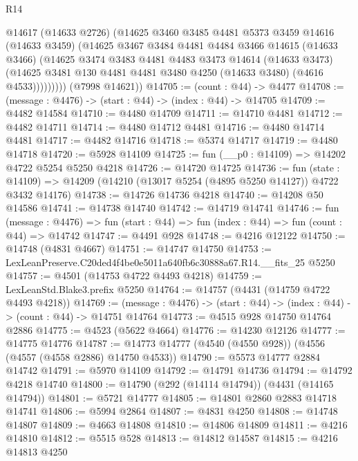 \begin{lexlean}{R14}
\begin{coremodule}
              @14617
              (@14633 @2726)
              (@14625
                @3460
                @3485
                @4481
                @5373
                @3459
                @14616
                (@14633 @3459)
                (@14625
                  @3467
                  @3484
                  @4481
                  @4484
                  @3466
                  @14615
                  (@14633 @3466)
                  (@14625
                    @3474
                    @3483
                    @4481
                    @4483
                    @3473
                    @14614
                    (@14633 @3473)
                    (@14625 @3481 @130 @4481 @4481 @3480 @4250 (@14633 @3480) (@4616 @4533)))))))))
      (@7998 @14621))
@14705 := (count : @44) -> @4477
@14708 := (message : @4476) -> (start : @44) -> (index : @44) -> @14705
@14709 := @4482 @14584
@14710 := @4480 @14709
@14711 := @14710 @4481
@14712 := @4482 @14711
@14714 := @4480 @14712 @4481
@14716 := @4480 @14714 @4481
@14717 := @4482 @14716
@14718 := @5374 @14717
@14719 := @4480 @14718
@14720 := @5928 @14109
@14725 := fun (__p0 : @14109) => @14202 @4722 @5254 @5250 @4218
@14726 := @14720 @14725
@14736 := fun (state : @14109) =>
  @14209 (@14210 (@13017 @5254 (@4895 @5250 @14127)) @4722 @3432 @14176)
@14738 := @14726 @14736 @4218
@14740 := @14208 @50 @14586
@14741 := @14738 @14740
@14742 := @14719 @14741
@14746 := fun (message : @4476) =>
  fun (start : @44) => fun (index : @44) => fun (count : @44) => @14742
@14747 := @4491 @928
@14748 := @4216 @12122
@14750 := @14748 (@4831 @4667)
@14751 := @14747 @14750
@14753 := LexLeanPreserve.C20ded4f4be0e5011a640fb6c30888a67.R14.__fits_25 @5250
@14757 := @4501 (@14753 @4722 @4493 @4218)
@14759 := LexLeanStd.Blake3.prefix @5250
@14764 := @14757 (@4431 (@14759 @4722 @4493 @4218))
@14769 := (message : @4476) -> (start : @44) -> (index : @44) -> (count : @44) -> @14751 @14764
@14773 := @4515 @928 @14750 @14764 @2886
@14775 := @4523 (@5622 @4664)
@14776 := @14230 @12126
@14777 := @14775 @14776
@14787 := @14773 @14777 (@4540 (@4550 @928)) (@4556 (@4557 (@4558 @2886) @14750 @4533))
@14790 := @5573 @14777 @2884 @14742
@14791 := @5970 @14109
@14792 := @14791 @14736
@14794 := @14792 @4218 @14740
@14800 := @14790 (@292 (@14114 @14794)) (@4431 (@14165 @14794))
@14801 := @5721 @14777
@14805 := @14801 @2860 @2883 @14718 @14741
@14806 := @5994 @2864
@14807 := @4831 @4250
@14808 := @14748 @14807
@14809 := @4663 @14808
@14810 := @14806 @14809
@14811 := @4216 @14810
@14812 := @5515 @528
@14813 := @14812 @14587
@14815 := @4216 @14813 @4250

\end{coremodule}
\end{lexlean}
